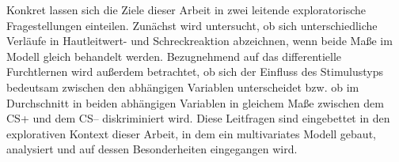	Konkret lassen sich die Ziele dieser Arbeit in zwei leitende exploratorische Fragestellungen einteilen. 
	Zunächst wird untersucht, ob sich unterschiedliche Verläufe in Hautleitwert- und Schreckreaktion abzeichnen, wenn beide Maße im Modell gleich behandelt werden.
	Bezugnehmend auf das differentielle Furchtlernen wird außerdem betrachtet, ob sich der Einfluss des Stimulustyps bedeutsam zwischen den abhängigen Variablen unterscheidet bzw. ob im Durchschnitt in beiden abhängigen Variablen in gleichem Maße zwischen dem CS+ und dem CS-- diskriminiert wird.
	Diese Leitfragen sind eingebettet in den explorativen Kontext dieser Arbeit, in dem ein multivariates Modell gebaut, analysiert und auf dessen Besonderheiten %
	eingegangen wird.
	

%	 

	 



